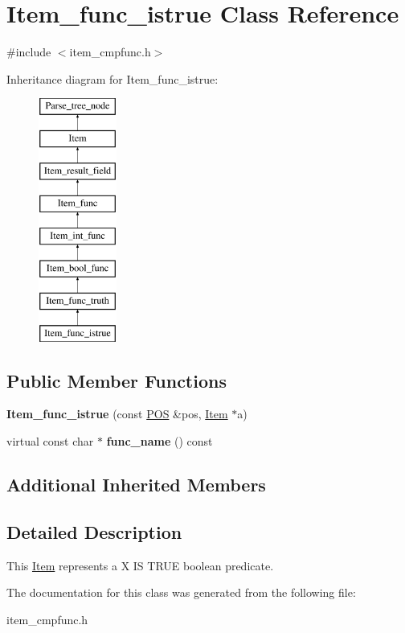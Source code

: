 \hypertarget{classItem__func__istrue}{}\section{Item\+\_\+func\+\_\+istrue Class Reference}
\label{classItem__func__istrue}


{\ttfamily \#include $<$item\+\_\+cmpfunc.\+h$>$}

Inheritance diagram for Item\+\_\+func\+\_\+istrue\+:\begin{figure}[H]
\begin{center}
\leavevmode
\includegraphics[height=8.000000cm]{classItem__func__istrue}
\end{center}
\end{figure}
\subsection*{Public Member Functions}
\begin{DoxyCompactItemize}
\item 
\mbox{\label{classItem__func__istrue_a0b0619c3099b34631397744223ffa9d6}} 
{\bfseries Item\+\_\+func\+\_\+istrue} (const \mbox{\hyperlink{structYYLTYPE}{P\+OS}} \&pos, \mbox{\hyperlink{classItem}{Item}} $\ast$a)
\item 
\mbox{\label{classItem__func__istrue_a09537474553c593bdaf15429f087bd95}} 
virtual const char $\ast$ {\bfseries func\+\_\+name} () const
\end{DoxyCompactItemize}
\subsection*{Additional Inherited Members}


\subsection{Detailed Description}
This \mbox{\hyperlink{classItem}{Item}} represents a {\ttfamily X IS T\+R\+UE} boolean predicate. 

The documentation for this class was generated from the following file\+:\begin{DoxyCompactItemize}
\item 
item\+\_\+cmpfunc.\+h\end{DoxyCompactItemize}
